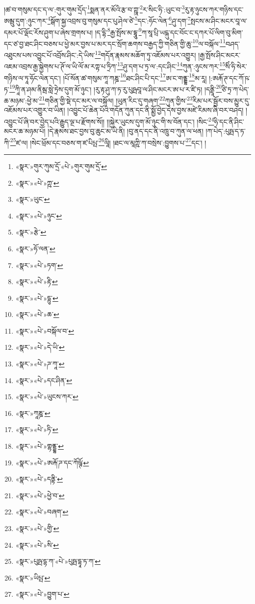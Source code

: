 །ཚ་བ་གསུམ་དང་ད་ལ་:གུར་གུམ་དྲོད་\footnote{«སྣར་»གུར་ཀུམ་དྲོ་«པེ་»གུར་གུམ་དྲོ་}སྨན་ནར་མོའི་རྩ་བ་ཀྵཱ་\footnote{«སྣར་»«པེ་»ཀྵ་}ར་སིང་ཧི་:ཡུང་བ་\footnote{«སྣར་»ཡུང་}རུ་རྟ་ཉུངས་ཀར་གཉིས་དང་ཨམྦུ་དུག་:ཉུང་ཀར་\footnote{«སྣར་»«པེ་»ཉུང་}སྒོག་སྐྱ་འབྲས་བུ་གསུམ་དང་པུ་ཤེལ་ཙེ་\footnote{«སྣར་»རྩེ་}དང་:ཧོང་ལེན་\footnote{«སྣར་»ཧོ་ལན་}ཤུ་དག་\footnote{«སྣར་»«པེ་»ཏག་}སྤངས་མ་ཤིང་མངར་བཱ་ལ་དམར་པོ་ལྡོང་རོས་ཤུག་པ་ཞེས་གྲགས་པ། །ད་དྷི་\footnote{«སྣར་»«པེ་»རྟི་}རྒྱ་སྤོས་མ་དྷཱུ་\footnote{«སྣར་»«པེ་»དྷུ་}ཀ་སཱ་པྲི་ཡངྐུ་དང་བོང་ང་དཀར་པོ་ལིག་བུ་མིག་དང་ཙ་བྱ་ཐང་ཤིང་བཅས་པ་ཕྱེ་མར་བྱས་པ་མར་དང་སྲོག་ཆགས་བརྒྱད་ཀྱི་གཅིན་གྱི་ཆུ་\footnote{«སྣར་»«པེ་»ཆ་}ལ་བསྐོལ་\footnote{«སྣར་»«པེ་»བསྐོལ་བ་}བཤད་འཐུངས་པས་འབྱུང་པོ་འབྲོས་ཤིང་:དེ་ཡིས་\footnote{«སྣར་»«པེ་»དེ་ཡི་}གདོན་རྣམས་མཆོག་ཏུ་འཇོམས་པར་འགྱུར། །རྒྱ་སྤོས་ཤིང་མངར་འཇམ་འབྲས་རྒྱ་སྐྱེགས་པ་ཊོ་ལ་ཡི་ལོ་མ་རཀྟ་པ་ཏྲིཀ་\footnote{«སྣར་»«པེ་»ཌ་ཀཱ་}ཤུ་དག་པ་ཏྲ་ལ་:དང་ཤིང་\footnote{«སྣར་»«པེ་»དང་ཤིན་}ཀུན་:ཉུངས་ཀར་\footnote{«སྣར་»«པེ་»ཡུངས་ཀར་}སིཾ་ཧི་སེར་གཉིས་ལ་ཏཱ་ཧོང་ལེན་དང་། །པོ་སོན་ཚ་གསུམ་ཀཱ་ཀཎྜ་\footnote{«སྣར་»ཀཱཎྜ་}ཐང་ཤིང་པི་དང་\footnote{«སྣར་»«པེ་»ཏི་}ཨ་ང་གནྡྷ་\footnote{«སྣར་»«པེ་»གྷནྡྷ་}མ་རཱ། །:ཨརྐོ་ཊ་དང་ཀོ་ཥ་ཏ་\footnote{«སྣར་»«པེ་»ཨརྐོ་ཌ་དང་ཀོཥྚོ་}ཀཱི་ན་ཤམ་ནིམྦ་སླེ་ཏྲེས་དུག་མོ་ཉུང་། །རུ་རྟ་ཤུ་ཀ་ཏ་རུ་པུཥྤབཱ་ལ་ཤིང་མངར་ཨ་པ་ར་ཛི་ཏ། །དནྡཱི་\footnote{«སྣར་»«པེ་»དནྟི་}ཙི་ཏྲ་ཀ་པེད་ཆ་མཉམ་:ཕྱེ་མ་\footnote{«སྣར་»«པེ་»ཕྱེ་བ་}གཅིན་གྱི་སྡེ་དང་མར་ལ་བསྐོལ། །ཡུན་རིང་དུ་གཞག་\footnote{«སྣར་»«པེ་»བཞག་}ཀུན་གྱིས་\footnote{«སྣར་»«པེ་»གྱི་}རིམ་པར་སྦྱོར་བས་མྱུར་དུ་འཇོམས་པར་འགྱུར་བ་ཡིན། །འབྱུང་པོ་ཆེན་པོའི་གདོན་ཀུན་དང་ནི་སྨྱོ་བྱེད་དེས་བྱས་མཛེ་རིམས་ཞི་བར་བཤད། །འབྱུང་པོ་ཞི་བར་བྱེད་པའི་རྒྱུད་ལྔ་པ་རྫོགས་སོ།། །།སྐྱེར་ཡུངས་དུག་མོ་ཉུང་གི་ས་བོན་དང་། །སིང་\footnote{«སྣར་»«པེ་»སི་}ཧི་དང་ནི་ཤིང་མངར་ཆ་མཉམ་པོ། །དེ་རྣམས་ཐང་བྱས་བུ་ཆུང་མ་ཡི་ནི། །བུ་ནད་དང་ནི་འཁྲུ་བ་ཀུན་ལ་ཕན། །ཀ་པེད་:པུཥྤ་ད་ཏ་ཀི་\footnote{«སྣར་»པུཥྤ་དྷ་ཀ་«པེ་»པུཥྤ་དྷཱ་ཏ་ཀ་}ཛ་ལ། །སེང་ཕྲོམ་དང་བཅས་ག་ཛ་པིཔྤ་\footnote{«སྣར་»ཡིཔྤ་}ལཱི། །ཐང་ལ་མཱཀྵི་ཀ་བསྲེས་:བྱུགས་པ་\footnote{«སྣར་»«པེ་»བྱུག་པ་}དང་། །

